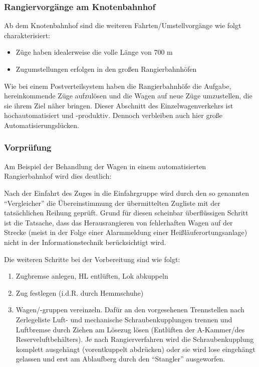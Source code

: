 \subsubsection{Rangiervorgänge am Knotenbahnhof}\label{sec:RangKnoten}
Ab dem Knotenbahnhof sind die weiteren Fahrten/Umstellvorgänge wie folgt charakterisiert:
\begin{itemize}
    \item Züge haben idealerweise die volle Länge von 700 m
    \item Zugumstellungen erfolgen in den großen Rangierbahnhöfen
\end{itemize}
Wie bei einem Postverteilsystem haben die Rangierbahnhöfe die Aufgabe, hereinkommende Züge aufzulösen und die Wagen auf neue Züge umzustellen, die sie ihrem Ziel näher bringen. Dieser Abschnitt des Einzelwagenverkehrs ist hochautomatisiert und -produktiv. Dennoch verbleiben auch hier große Automatisierungslücken. 
\subsubsection{Vorprüfung}\label{sec:Vorpruefung}
Am Beispiel der Behandlung der Wagen in einem automatisierten Rangierbahnhof wird dies deutlich:\par
Nach der Einfahrt des Zuges in die Einfahrgruppe wird durch den so genannten "`Vergleicher"' die Übereinstimmung der übermittelten Zugliste mit der tatsächlichen Reihung geprüft. Grund für diesen scheinbar überflüssigen Schritt ist die Tatsache, dass das Herausrangieren von fehlerhaften Wagen auf der Strecke (meist in der Folge einer Alarmmeldung einer Heißläuferortungsanlage) nicht in der Informationstechnik berücksichtigt wird.\par
Die weiteren Schritte bei der Vorbereitung sind wie folgt:
\begin{enumerate}
    \item Zugbremse anlegen, HL entlüften, Lok abkuppeln
    \item Zug festlegen (i.d.R. durch Hemmschuhe)
    \item Wagen/-gruppen vereinzeln. Dafür an den vorgesehenen Trennstellen nach Zerlegeliste Luft- und mechanische Schraubenkupplungen trennen und Luftbremse durch Ziehen am Lösezug lösen (Entlüften der A-Kammer/des Reserveluftbehälters). Je nach Rangierverfahren wird die Schraubenkupplung komplett ausgehängt (vorentkuppelt abdrücken) oder sie wird lose eingehängt gelassen und erst am Ablaufberg durch den "`Stangler"' ausgeworfen.
\end{enumerate}
